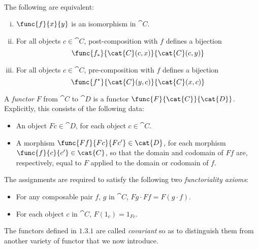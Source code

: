 \documentclass[main.tex]{subfiles}
\begin{document}
\paragraph{}
\begin{lemma}
	The following are equivalent:
	\begin{enumerate}[(i)]
		\item $\func{f}{x}{y}$ is an isomorphism in $\cat{C}$.

		\item For all objects $c\in\cat{C}$, post-composition with $f$ defines a
			bijection \[\func{f_*}{\cat{C}(c,x)}{\cat{C}(c,y)}\]

		\item For all objects $c\in\cat{C}$, pre-composition with $f$ defines a
			bijection \[\func{f^*}{\cat{C}(y,c)}{\cat{C}(x,c)}\]
	\end{enumerate}
\end{lemma}

\begin{definition}
	A \emph{functor} $F$ from $\cat{C}$ to $\cat{D}$ is a functor
	$\func{F}{\cat{C}}{\cat{D}}$. Explicitly, this consists of the following
	data:
	\begin{itemize}
		\item An object $Fc\in \cat{D}$, for each object $c\in \cat{C}$.

		\item A morphism $\func{Ff}{Fc}{Fc'}\in \cat{D}$, for each morphism
			$\func{f}{c}{c'}\in \cat{C}$, so that the domain and codomain of
			$Ff$ are, respectively, equal to $F$ applied to the domain or
			codomain of $f$.
	\end{itemize}
	The assignments are required to satisfy the following two
	\emph{functoriality axioms}:
	\begin{itemize}
		\item For any composable pair $f$, $g$ in $\cat{C}$, $Fg\cdot Ff =
			F(g\cdot f)$.

		\item For each object $c$ in $\cat{C}$, $F(1_c) = 1_{Fc}$.
	\end{itemize}
\end{definition}
The functors defined in $1.3.1$ are called \emph{covariant} so as to distinguish
them from another variety of functor that we now introduce.
\end{document}
